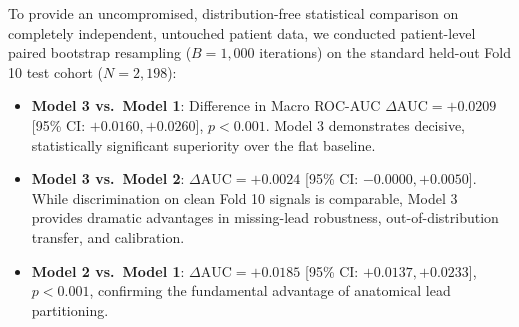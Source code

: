 \documentclass[12pt]{elsarticle}
\begin{document}
To provide an uncompromised, distribution-free statistical comparison on completely independent, untouched patient data, we conducted patient-level paired bootstrap resampling ($B = 1,000$ iterations) on the standard held-out Fold 10 test cohort ($N = 2,198$):
\begin{itemize}
    \item \textbf{Model 3 vs.\ Model 1}: Difference in Macro ROC-AUC $\Delta \text{AUC} = \mathbf{+0.0209}$ [95\% CI: $\mathbf{+0.0160, +0.0260}$], $p < 0.001$. Model 3 demonstrates decisive, statistically significant superiority over the flat baseline.
    \item \textbf{Model 3 vs.\ Model 2}: $\Delta \text{AUC} = \mathbf{+0.0024}$ [95\% CI: $\mathbf{-0.0000, +0.0050}$]. While discrimination on clean Fold 10 signals is comparable, Model 3 provides dramatic advantages in missing-lead robustness, out-of-distribution transfer, and calibration.
    \item \textbf{Model 2 vs.\ Model 1}: $\Delta \text{AUC} = \mathbf{+0.0185}$ [95\% CI: $\mathbf{+0.0137, +0.0233}$], $p < 0.001$, confirming the fundamental advantage of anatomical lead partitioning.
\end{itemize}
\end{document}
